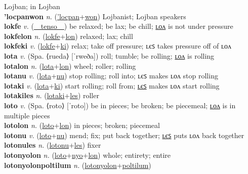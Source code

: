 Lojban; in Lojban \label{'locpanak} \\
\textbf{'locpanwon} \textit{n.} (\hyperref['locpan]{'locpan}+\hyperref[won]{won})
Lojbanist; Lojban speakers \label{'locpanwon} \\
\textbf{lokfe} \textit{v.} (\hyperref[tenso]{~~tenso~~})
be relaxed; be lax; be chill; \hyperref[lokfelon]{ʟᴏᴧ} is not under pressure \label{lokfe} \\
\textbf{lokfelon} \textit{n.} (\hyperref[lokfe]{lokfe}+\hyperref[lon]{lon})
relaxed; lax; chill \label{lokfelon} \\
\textbf{lokfeki} \textit{v.} (\hyperref[lokfe]{lokfe}+\hyperref[ki]{ki})
relax; take off pressure; ʟєꜱ takes pressure off of ʟᴏᴧ \label{lokfeki} \\
\textbf{lota} \textit{v.} (Spa. ⟨rueda⟩ [ˈrweða])
roll; tumble; be rolling; \hyperref[lotalon]{ʟᴏᴧ} is rolling \label{lota} \\
\textbf{lotalon} \textit{n.} (\hyperref[lota]{lota}+\hyperref[lon]{lon})
wheel; roller; rolling \label{lotalon} \\
\textbf{lotanu} \textit{v.} (\hyperref[lota]{lota}+\hyperref[nu]{nu})
stop rolling; roll into; ʟєꜱ makes ʟᴏᴧ stop rolling \label{lotanu} \\
\textbf{lotaki} \textit{v.} (\hyperref[lota]{lota}+\hyperref[ki]{ki})
start rolling; roll from; \hyperref[lotakiles]{ʟєꜱ} makes ʟᴏᴧ start rolling \label{lotaki} \\
\textbf{lotakiles} \textit{n.} (\hyperref[lotaki]{lotaki}+\hyperref[les]{les})
roller \label{lotakiles} \\
\textbf{loto} \textit{v.} (Spa. ⟨roto⟩ [ˈroto])
be in pieces; be broken; be piecemeal; \hyperref[lotolon]{ʟᴏᴧ} is in multiple pieces \label{loto} \\
\textbf{lotolon} \textit{n.} (\hyperref[loto]{loto}+\hyperref[lon]{lon})
in pieces; broken; piecemeal \label{lotolon} \\
\textbf{lotonu} \textit{v.} (\hyperref[loto]{loto}+\hyperref[nu]{nu})
mend; fix; put back together; \hyperref[lotonules]{ʟєꜱ} puts ʟᴏᴧ back together \label{lotonu} \\
\textbf{lotonules} \textit{n.} (\hyperref[lotonu]{lotonu}+\hyperref[les]{les})
fixer \label{lotonules} \\
\textbf{lotonyolon} \textit{n.} (\hyperref[loto]{loto}+\hyperref[nyo]{nyo}+\hyperref[lon]{lon})
whole; entirety; entire \label{lotonyolon} \\
\textbf{lotonyolonpoltilum} \textit{n.} (\hyperref[lotonyolon]{lotonyolon}+\hyperref[poltilum]{poltilum})
